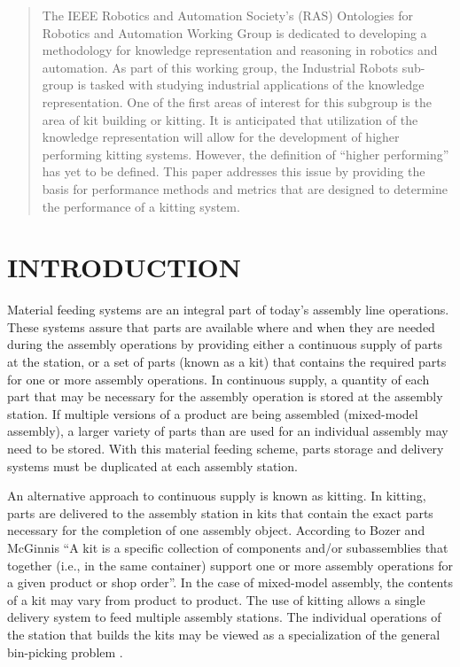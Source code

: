 



%
\maketitle
\thispagestyle{empty}
\pagestyle{plain}

\begin{abstract}

The IEEE Robotics and Automation Society\rq{}s (RAS) Ontologies for Robotics and Automation Working Group is dedicated to
developing a methodology for knowledge representation and reasoning in robotics
and automation. As part of this working group, the Industrial Robots sub-group is
tasked with studying industrial applications of the knowledge representation. One of the first
areas of interest for this subgroup is the area of kit building or kitting.
It is anticipated that utilization of the knowledge representation will allow for the development
of higher performing kitting systems. However, the definition of ``higher performing''
has yet to be defined. This paper addresses this issue by providing the basis
for performance methods and metrics that are designed to
determine the performance of a kitting system.
\end{abstract}


\section{INTRODUCTION}
Material feeding systems are an integral part of today's assembly line operations.
These systems assure that parts are available where and when
they are needed during the assembly operations by providing either a continuous
supply of parts at the station, or a set of parts (known
as a kit) that contains the required parts for one or more assembly operations.
In continuous supply, a quantity of each part that
may be necessary for the assembly operation is stored at the assembly station.
If multiple versions of a product are being assembled (mixed-model assembly),
a larger variety of parts than are used for an individual assembly may need
to be stored. With this material feeding scheme, parts
storage and delivery systems must be duplicated at each assembly station.

An alternative approach to continuous supply is known as kitting. In kitting,
parts are delivered to the assembly station in kits that contain
the exact parts necessary for the completion of one assembly object.
According to Bozer and McGinnis \cite{Bozer1992} ``A kit is a specific
collection of components and/or subassemblies that together
(i.e., in the same container) support one or more assembly
operations for a given product or shop order''. In the case of mixed-model
assembly, the contents of a kit may vary from product to product.
The use of kitting allows a single delivery system to feed
multiple assembly stations. The individual operations of the station that
builds the kits may be viewed as a specialization of the general
bin-picking problem \cite{Schyja2012}.

